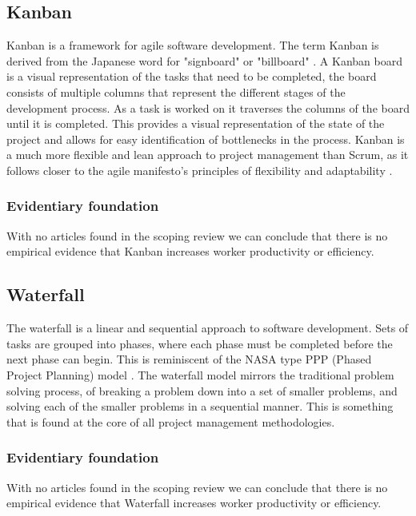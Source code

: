 \documentclass[12pt]{article}
\begin{document}
\subsection{Kanban}
Kanban is a framework for agile software development. The term Kanban is derived from the Japanese word for "signboard" or "billboard" \cite{KanbanDevelopment2025}.
A Kanban board is a visual representation of the tasks that need to be completed, the board consists of multiple columns that represent the 
different stages of the development process. As a task is worked on it traverses the columns of the board until it is completed.
This provides a visual representation of the state of the project and allows for easy identification of bottlenecks in the process.
Kanban is a much more flexible and lean approach to project management than Scrum, as it follows closer to the agile manifesto's principles 
of flexibility and adaptability \cite{ManifestoAgileSoftware}.

\subsubsection{Evidentiary foundation}
With no articles found in the scoping review we can conclude that there is no empirical evidence that Kanban increases worker productivity or efficiency.

\subsection{Waterfall}
The waterfall \cite{WaterfallModel2025} is a linear and sequential approach to software development. Sets of tasks are grouped into phases, 
where each phase must be completed before the next phase can begin. This is reminiscent of the NASA type PPP 
(Phased Project Planning) model \cite{PhasedProjectPlanning1968}.
The waterfall model mirrors the traditional problem solving process, of breaking a problem down into a set of smaller problems,
and solving each of the smaller problems in a sequential manner. This is something that is found at the core 
of all project management methodologies.

\subsubsection{Evidentiary foundation}
With no articles found in the scoping review we can conclude that there is no empirical evidence that Waterfall increases worker productivity or efficiency.
\end{document}

